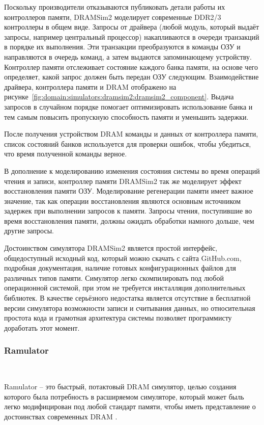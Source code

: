 Поскольку производители отказываются публиковать детали работы их контроллеров памяти, DRAMSim2 моделирует современные DDR2/3 контроллеры в общем виде. Запросы от драйвера (любой модуль, который выдаёт запросы, например центральный процессор) накапливаются в очереди транзакций в порядке их выполнения.  Эти транзакции преобразуются в команды ОЗУ и направляются в очередь команд, а затем выдаются запоминающему устройству. Контроллер памяти отслеживает состояние каждого банка памяти, на основе чего определяет, какой запрос должен быть передан ОЗУ следующим. Взаимодействие драйвера, контроллера памяти и DRAM отображено на рисунке~\ref{fig:domain:simulators:dramsim2:dramsim2_component}. Выдача запросов в случайном порядке помогает оптимизировать использование банка и тем самым повысить пропускную способность памяти и уменьшить задержки.

После получения устройством DRAM команды и данных от контроллера памяти, список состояний банков используется для проверки ошибок, чтобы убедиться, что время полученной команды верное. 

В дополнение к моделированию изменения состояния системы во время операций чтения и записи, контроллер памяти DRAMSim2 так же моделирует эффект восстановления памяти ОЗУ. Моделирование регенерации памяти имеет важное значение, так как операции восстановления являются основным источником задержек при выполнении запросов к памяти. Запросы чтения, поступившие во время восстановления памяти, должны ожидать обработки намного дольше, чем другие запросы. 

Достоинством симулятора DRAMSim2 является простой интерфейс, общедоступный исходный код, который можно скачать с сайта GitHub.com, подробная документация, наличие готовых конфигурационных файлов для различных типов памяти. Симулятор легко скомпилировать под любой операционной системой, при этом не требуется инсталляция дополнительных библиотек.  В качестве серьёзного недостатка является отсутствие в бесплатной версии симулятора возможности записи и считывания данных, но относительная простота кода и грамотная архитектура системы позволяет программисту доработать этот момент.  

\subsubsection{Ramulator}~\\
\label{page:domain:simulators:ramulator}

Ramulator – это быстрый, потактовый DRAM симулятор, целью создания которого была потребность в расширяемом симуляторе, который может быль легко модифицирован под любой стандарт памяти, чтобы иметь представление о достоинствах современных DRAM \cite{ramulator_manual}.

